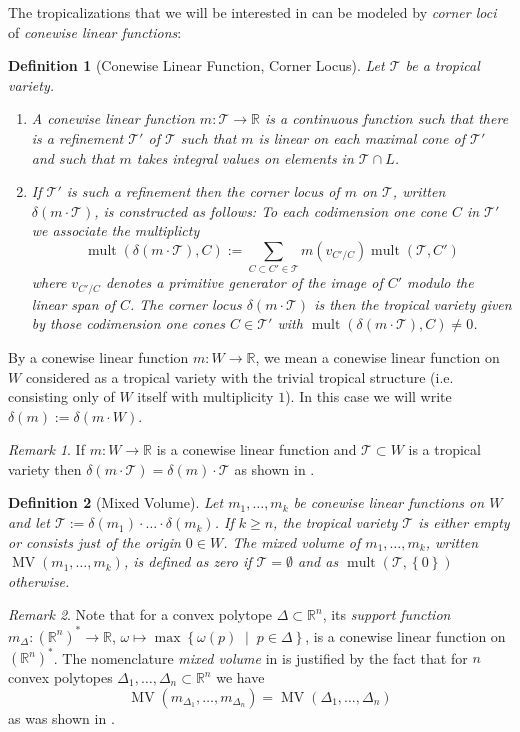 \documentclass[a4paper]{article}
\newtheorem{definition}{Definition}
\theoremstyle{remark}
\newtheorem{remark}{Remark}
\newcommand{\set}[1]{\left\{#1\right\}}
\newcommand{\setdes}[2]{\left\{#1\;\middle|\;#2\right\}}
\def\RR{\mathbb{R}}
\def\corn{\delta}
\def\tvar{\mathcal{T}}
\DeclareMathOperator{\mv}{MV}
\DeclareMathOperator{\mult}{mult}
\begin{document}
The tropicalizations that we will be interested in can be modeled by
{\em corner loci} of {\em conewise linear functions}:
\begin{definition}[Conewise Linear Function, Corner Locus]
  \label{def:cornerlocus}
  Let $\tvar$ be a tropical variety.
  \begin{enumerate}
  \item A {\em conewise linear function} $m: \tvar\rightarrow \RR$ is a
    continuous function such that there is a refinement $\tvar'$ of
    $\tvar$ such that $m$ is linear on each maximal cone of $\tvar'$
    and such that $m$ takes integral values on elements in
    $\tvar \cap L$.
  \item If $\tvar'$ is such a refinement then the {\em corner locus}
    of $m$ on $\tvar$, written $\corn(m\cdot \tvar)$, is constructed as
    follows: To each codimension one cone $C$ in $\tvar'$ we associate
    the multiplicty
  \[\mult(\corn(m\cdot \tvar), C) := \sum_{C\subset C'\in \tvar}m(v_{C'/C})\mult(\tvar,C')\]
  where $v_{C'/C}$ denotes a primitive generator of the image of $C'$
  modulo the linear span of $C$. The corner locus
  $\corn(m\cdot \tvar)$ is then the tropical variety given by those
  codimension one cones $C\in \tvar'$ with $\mult(\corn(m\cdot \tvar), C)\neq 0$.
  \end{enumerate}
\end{definition}
By a conewise linear function $m:W\rightarrow \RR$, we mean a conewise linear
function on $W$ considered as a tropical variety with the trivial
tropical structure (i.e. consisting only of $W$ itself with
multiplicity $1$). In this case we will write
$\corn(m) := \corn(m\cdot W)$.
\begin{remark}
  If $m :W\rightarrow \RR$ is a conewise linear function and
  $\tvar\subset W$ is a tropical variety then
  $\corn(m\cdot \tvar) = \corn(m) \cdot \tvar$ as shown in
  \cite{esterovTropicalVarietiesPolynomial2012}.
\end{remark}

\begin{definition}[Mixed Volume]
  \label{def:mv}
  Let $m_1,\hdots,m_k$ be conewise linear functions on $W$ and let
  $\tvar:=\corn(m_1)\cdot\hdots \cdot \corn(m_k)$. If $k\geq n$, the tropical variety
  $\tvar$ is either empty or consists just of the origin $0\in W$. The
  {\em mixed volume} of $m_1,\hdots,m_k$, written $\mv(m_1,\hdots,m_k)$,
  is defined as zero if $\tvar = \emptyset$ and as
  $\mult(\tvar, \set{0})$ otherwise.
\end{definition}
\begin{remark}
  Note that for a convex polytope $\Delta\subset \RR^n$, its {\em support
    function} $m_{\Delta}:(\RR^n)^{*}\rightarrow \RR$,
  $\omega\mapsto \max\setdes{\omega(p)}{p\in \Delta}$, is a conewise linear function on
  $(\RR^n)^{*}$. The nomenclature {\em mixed volume} in 
  is justified by the fact that for $n$ convex polytopes
  $\Delta_1,\hdots,\Delta_n\subset \RR^n$ we have
  \[\mv(m_{\Delta_1},\hdots,m_{\Delta_n}) = \mv(\Delta_1,\hdots,\Delta_n)\]
  as was shown in \cite{esterovTropicalVarietiesPolynomial2012}.
\end{remark}
\end{document}
